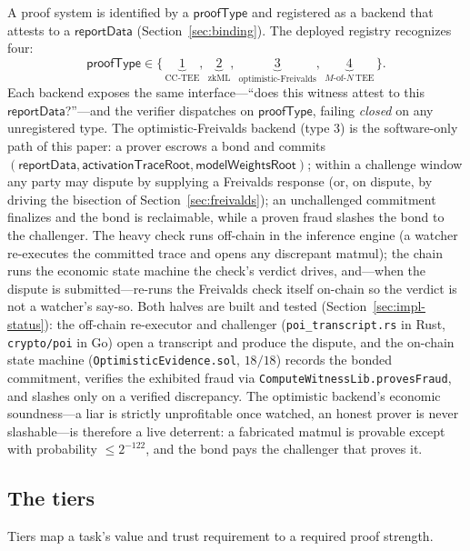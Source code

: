 A proof system is identified by a $\mathsf{proofType}$ and registered as a backend
that attests to a $\mathsf{reportData}$ (Section~\ref{sec:binding}). The deployed
registry recognizes four:
\begin{equation}
\mathsf{proofType} \in \{\,
  \underbrace{1}_{\text{CC-TEE}},\
  \underbrace{2}_{\text{zkML}},\
  \underbrace{3}_{\text{optimistic-Freivalds}},\
  \underbrace{4}_{M\text{-of-}N\ \text{TEE}}
\,\}.
\end{equation}
Each backend exposes the same interface---``does this witness attest to this
$\mathsf{reportData}$?''---and the verifier dispatches on $\mathsf{proofType}$,
failing \emph{closed} on any unregistered type. The optimistic-Freivalds backend
(type $3$) is the software-only path of this paper: a prover escrows a bond and
commits $(\mathsf{reportData}, \mathsf{activationTraceRoot}, \mathsf{modelWeightsRoot})$;
within a challenge window any party may dispute by supplying a Freivalds response (or,
on dispute, by driving the bisection of Section~\ref{sec:freivalds}); an
unchallenged commitment finalizes and the bond is reclaimable, while a proven fraud
slashes the bond to the challenger. The heavy check runs off-chain in the inference engine
(a watcher re-executes the committed trace and opens any discrepant matmul); the chain runs
the economic state machine the check's verdict drives, and---when the dispute is
submitted---re-runs the Freivalds check itself on-chain so the verdict is not a watcher's
say-so. Both halves are built and tested (Section~\ref{sec:impl-status}): the off-chain
re-executor and challenger (\texttt{poi\_transcript.rs} in Rust, \texttt{crypto/poi} in Go)
open a transcript and produce the dispute, and the on-chain state machine
(\texttt{OptimisticEvidence.sol}, $18/18$) records the bonded commitment, verifies the
exhibited fraud via \texttt{ComputeWitnessLib.provesFraud}, and slashes only on a verified
discrepancy. The optimistic backend's economic soundness---a liar is strictly unprofitable
once watched, an honest prover is never slashable---is therefore a live deterrent: a
fabricated matmul is provable except with probability $\le 2^{-122}$, and the bond pays the
challenger that proves it.

\subsection{The tiers}

Tiers map a task's value and trust requirement to a required proof strength.

